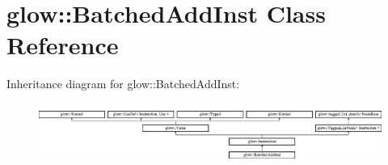\hypertarget{classglow_1_1_batched_add_inst}{}\section{glow\+:\+:Batched\+Add\+Inst Class Reference}
\label{classglow_1_1_batched_add_inst}
Inheritance diagram for glow\+:\+:Batched\+Add\+Inst\+:\begin{figure}[H]
\begin{center}
\leavevmode
\includegraphics[height=1.991111cm]{classglow_1_1_batched_add_inst}
\end{center}
\end{figure}
